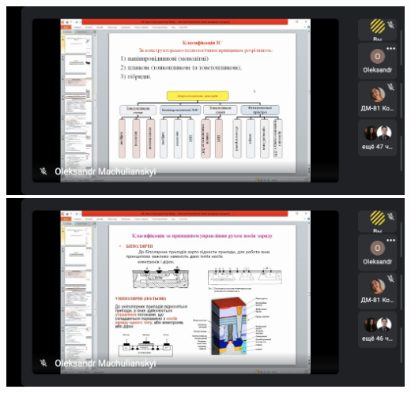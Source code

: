 \documentclass[a4paper,14pt]{extreport}
\begin{document}
\begin{center}
\includegraphics[scale = 0.3]{13.jpg}
\includegraphics[scale = 0.3]{14.jpg}
\end{center}
\end{document}
